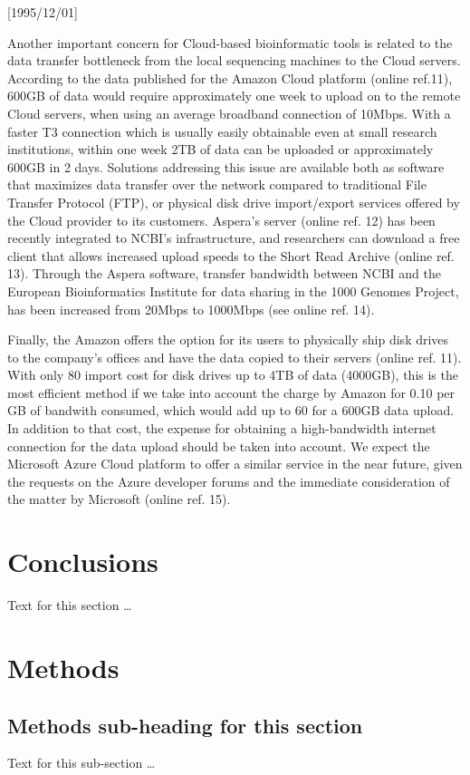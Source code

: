 \NeedsTeXFormat{LaTeX2e}[1995/12/01] \documentclass[10pt]{bmc_article}
\newenvironment{bmcformat}{\begin{raggedright}\baselineskip20pt\sloppy\setboolean{publ}{false}}{\end{raggedright}\baselineskip20pt\sloppy}
\begin{document}
\begin{bmcformat}
Another important concern for Cloud-based bioinformatic tools is related to the data transfer bottleneck from
the local sequencing machines to the Cloud servers.  According to the data published for the Amazon Cloud
platform (online ref.11), 600GB of data would require approximately one week to upload on to the remote Cloud
servers, when using an average broadband connection of 10Mbps. With a faster T3 connection which is usually
easily obtainable even at small research institutions, within one week 2TB of data can be uploaded or
approximately 600GB in 2 days.  Solutions addressing this issue are available both as software that maximizes
data transfer over the network compared to traditional File Transfer Protocol (FTP), or physical disk drive
import/export services offered by the Cloud provider to its customers. Aspera's server (online ref. 12) has
been recently integrated to NCBI's infrastructure, and researchers can download a free client that allows
increased upload speeds to the Short Read Archive (online ref. 13).  Through the Aspera software, transfer
bandwidth between NCBI and the European Bioinformatics Institute for data sharing in the 1000 Genomes Project,
has been increased from 20Mbps to 1000Mbps (see online ref. 14). 

Finally, the Amazon offers the option for its users to physically ship disk drives to the company's offices
and have the data copied to their servers (online ref. 11). With only 80 import cost for disk drives up to 4TB
of data (4000GB), this is the most efficient method if we take into account the charge by Amazon for 0.10 per
GB of bandwith consumed, which would add up to 60 for a 600GB data upload. In addition to that cost, the
expense for obtaining a high-bandwidth internet connection for the data upload should be taken into account.
We expect the Microsoft Azure Cloud platform to offer a similar service in the near future, given the requests
on the Azure developer forums and the immediate consideration of the matter by Microsoft (online ref. 15).



\section*{Conclusions} Text for this section \ldots



\section*{Methods} \subsection*{Methods sub-heading for this section} Text for this sub-section \ldots


\end{bmcformat}
\end{document}
